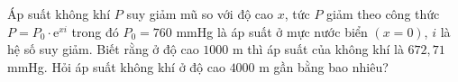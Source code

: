 \begin{bt}%
	Áp suất không khí $P$ suy giảm mũ so với độ cao $x$, tức $P$ giảm theo công thức $P=P_0\cdot \mathrm{e}^{xi}$ trong đó $P_0=760$ mmHg là áp suất ở mực nước biển $(x=0)$, $i$ là hệ số suy giảm. Biết rằng ở độ cao $1000$ m thì áp suất của không khí là $672{,}71$ mmHg. Hỏi áp suất không khí ở độ cao $4000$ m gần bằng bao nhiêu?
\end{bt}
